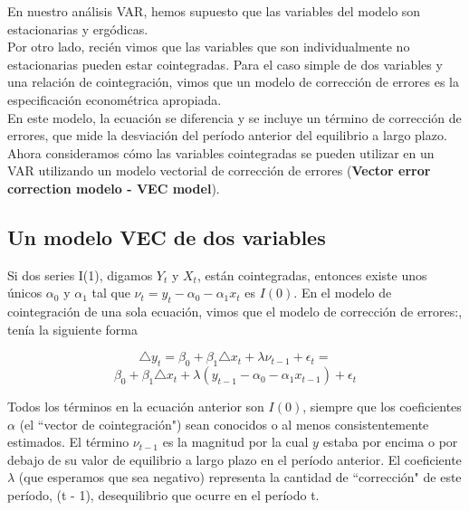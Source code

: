 		En nuestro an\'alisis VAR, hemos supuesto que las variables del modelo son estacionarias y erg\'odicas. \\
		Por otro lado, reci\'en vimos que las variables que son individualmente no estacionarias pueden estar cointegradas. Para el caso simple de dos variables y una relación de cointegraci\'on, vimos que un modelo de correcci\'on de errores es la especificaci\'on econom\'etrica apropiada. \\
		\vspace{4mm}	
		En este modelo, la ecuaci\'on se diferencia y se incluye un t\'ermino de correcci\'on de errores, que mide la desviaci\'on del per\'{i}odo anterior del equilibrio a largo plazo.\\
		Ahora consideramos c\'omo las variables cointegradas se pueden utilizar en un VAR utilizando un modelo vectorial de correcci\'on de errores (\textbf{Vector error correction modelo - VEC model}). 
		
	
	
	\subsection{\textbf{Un modelo VEC de dos variables}}
	
	Si dos series I(1), digamos $Y_t$ y $X_t$, est\'an cointegradas, entonces existe unos \'unicos $\alpha_0$ y $\alpha_1$ tal que $\nu_t = y_t - \alpha_0 - \alpha_1 x_t$ es $I(0)$. En el modelo de cointegraci\'on de una sola ecuaci\'on, vimos que el modelo de correcci\'on de errores:, ten\'{i}a la siguiente forma
	
	\begin{equation}
	\triangle y_t = \beta_0 + \beta_1 \triangle x_t + \lambda \nu_{t-1} + \epsilon_t = 
	\end{equation}
	\begin{equation*}
	\beta_0 + \beta_1 \triangle x_t + \lambda (y_{t-1} - \alpha_0 - \alpha_1 x_{t-1} ) + \epsilon_t
	\end{equation*}
	
	Todos los t\'erminos en la ecuaci\'on anterior son $I(0)$, siempre que los coeficientes $\alpha$ (el ``vector de cointegraci\'on") sean conocidos o al menos consistentemente estimados. El t\'ermino $\nu_{t -1}$ es la magnitud por la cual $y$ estaba por encima o por debajo de su valor de equilibrio a largo plazo en el per\'{i}odo anterior. El coeficiente $\lambda$ (que esperamos que sea negativo) representa la cantidad de ``correcci\'on" de este per\'{i}odo, (t - 1), desequilibrio que ocurre en el per\'{i}odo t. 
	
